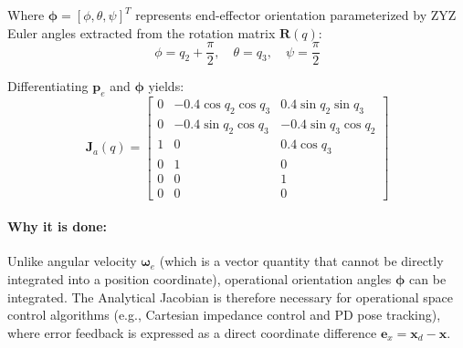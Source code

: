 \documentclass[11pt, a4paper]{article}
\begin{document}
Where $\boldsymbol{\phi} = [\phi, \theta, \psi]^T$ represents end-effector orientation parameterized by ZYZ Euler angles extracted from the rotation matrix $\mathbf{R}(q)$:
\begin{equation}
    \phi = q_2 + \frac{\pi}{2}, \quad \theta = q_3, \quad \psi = \frac{\pi}{2}
\end{equation}

Differentiating $\mathbf{p}_e$ and $\boldsymbol{\phi}$ yields:
\begin{equation}
\mathbf{J}_a(q) = \begin{bmatrix}
0 & -0.4 \cos q_2 \cos q_3 & 0.4 \sin q_2 \sin q_3 \\
0 & -0.4 \sin q_2 \cos q_3 & -0.4 \sin q_3 \cos q_2 \\
1 & 0 & 0.4 \cos q_3 \\
0 & 1 & 0 \\
0 & 0 & 1 \\
0 & 0 & 0
\end{bmatrix}
\end{equation}

\paragraph{Why it is done:}
Unlike angular velocity $\boldsymbol{\omega}_e$ (which is a vector quantity that cannot be directly integrated into a position coordinate), operational orientation angles $\boldsymbol{\phi}$ can be integrated. The Analytical Jacobian is therefore necessary for operational space control algorithms (e.g., Cartesian impedance control and PD pose tracking), where error feedback is expressed as a direct coordinate difference $\mathbf{e}_x = \mathbf{x}_d - \mathbf{x}$.
\end{document}
